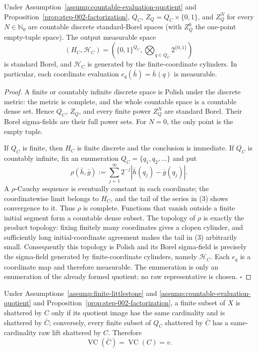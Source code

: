 \begin{proposition}\label{prop:step-002-borel}
Under Assumption~\ref{assump:countable-evaluation-quotient} and
Proposition~\ref{prop:step-002-factorization}, \(Q_C\),
\(Z_Q=Q_C\times\{0,1\}\), and \(Z_Q^N\) for every
\(N\in\mathbb N_0\) are countable discrete standard-Borel spaces (with
\(Z_Q^0\) the one-point empty-tuple space). The output measurable space
\[
(H_C,\mathcal H_C)
=\left(\{0,1\}^{Q_C},\bigotimes_{q\in Q_C}2^{\{0,1\}}\right)
\]
is standard Borel, and \(\mathcal H_C\) is generated by the finite-coordinate
cylinders. In particular, each coordinate evaluation
\(e_q(\bar h)=\bar h(q)\) is measurable.


\end{proposition}

\begin{proof}
A finite or countably infinite discrete space is Polish under the
discrete metric: the metric is complete, and the whole countable space is a
countable dense set. Hence \(Q_C\), \(Z_Q\), and every finite power \(Z_Q^N\)
are standard Borel. Their Borel sigma-fields are their full power sets. For
\(N=0\), the only point is the empty tuple.

If \(Q_C\) is finite, then \(H_C\) is finite discrete and the conclusion is
immediate. If \(Q_C\) is countably infinite, fix an enumeration
\(Q_C=\{q_1,q_2,\ldots\}\) and put
\[
\rho(\bar h,\bar g)
:=\sum_{j=1}^{\infty}2^{-j}
  |\bar h(q_j)-\bar g(q_j)|.
\tag{3}
\]
A \(\rho\)-Cauchy sequence is eventually constant in each coordinate; the
coordinatewise limit belongs to \(H_C\), and the tail of the series in (3)
shows convergence to it. Thus \(\rho\) is complete. Functions that vanish
outside a finite initial segment form a countable dense subset. The topology
of \(\rho\) is exactly the product topology: fixing finitely many coordinates
gives a clopen cylinder, and sufficiently long initial-coordinate agreement
makes the tail in (3) arbitrarily small. Consequently this topology is
Polish and its Borel sigma-field is precisely the sigma-field generated by
finite-coordinate cylinders, namely \(\mathcal H_C\). Each \(e_q\) is a
coordinate map and therefore measurable. The enumeration is only an
enumeration of the already formed quotient; no raw representative is chosen.
\(\square\)


\end{proof}

\begin{lemma}\label{lem:step-002-vc}
Under Assumptions~\ref{assump:finite-littlestone} and
\ref{assump:countable-evaluation-quotient} and
Proposition~\ref{prop:step-002-factorization}, a finite subset of \(X\) is
shattered by \(C\) only if its quotient image has the same cardinality and is
shattered by \(\bar C\); conversely, every finite subset of \(Q_C\) shattered
by \(\bar C\) has a same-cardinality raw lift shattered by \(C\). Therefore
\[
\operatorname{VC}(\bar C)=\operatorname{VC}(C)=v.
\tag{4}
\]


\end{lemma}

